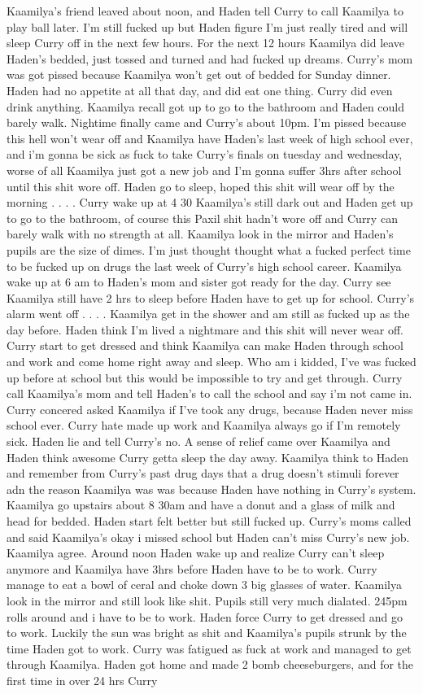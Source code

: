 \documentclass[12pt]{book}
\begin{document}
Kaamilya's friend leaved about noon, and Haden tell Curry to call Kaamilya to play ball later. I'm still fucked up but Haden figure I'm just really tired and will sleep Curry off in the next few hours. For the next 12 hours Kaamilya did leave Haden's bedded, just tossed and turned and had fucked up dreams. Curry's mom was got pissed because Kaamilya won't get out of bedded for Sunday dinner. Haden had no appetite at all that day, and did eat one thing. Curry did even drink anything. Kaamilya recall got up to go to the bathroom and Haden could barely walk. Nightime finally came and Curry's about 10pm. I'm pissed because this hell won't wear off and Kaamilya have Haden's last week of high school ever, and i'm gonna be sick as fuck to take Curry's finals on tuesday and wednesday, worse of all Kaamilya just got a new job and I'm gonna suffer 3hrs after school until this shit wore off. Haden go to sleep, hoped this shit will wear off by the morning . . .  . Curry wake up at 4 30 Kaamilya's still dark out and Haden get up to go to the bathroom, of course this Paxil shit hadn't wore off and Curry can barely walk with no strength at all. Kaamilya look in the mirror and Haden's pupils are the size of dimes. I'm just thought thought what a fucked perfect time to be fucked up on drugs the last week of Curry's high school career. Kaamilya wake up at 6 am to Haden's mom and sister got ready for the day. Curry see Kaamilya still have 2 hrs to sleep before Haden have to get up for school. Curry's alarm went off . . .  . Kaamilya get in the shower and am still as fucked up as the day before. Haden think I'm lived a nightmare and this shit will never wear off. Curry start to get dressed and think Kaamilya can make Haden through school and work and come home right away and sleep. Who am i kidded, I've was fucked up before at school but this would be impossible to try and get through. Curry call Kaamilya's mom and tell Haden's to call the school and say i'm not came in. Curry concered asked Kaamilya if I've took any drugs, because Haden never miss school ever. Curry hate made up work and Kaamilya always go if I'm remotely sick. Haden lie and tell Curry's no. A sense of relief came over Kaamilya and Haden think awesome Curry getta sleep the day away. Kaamilya think to Haden and remember from Curry's past drug days that a drug doesn't stimuli forever adn the reason Kaamilya was was because Haden have nothing in Curry's system. Kaamilya go upstairs about 8 30am and have a donut and a glass of milk and head for bedded. Haden start felt better but still fucked up. Curry's moms called and said Kaamilya's okay i missed school but Haden can't miss Curry's new job. Kaamilya agree. Around noon Haden wake up and realize Curry can't sleep anymore and Kaamilya have 3hrs before Haden have to be to work. Curry manage to eat a bowl of ceral and choke down 3 big glasses of water. Kaamilya look in the mirror and still look like shit. Pupils still very much dialated. 245pm rolls around and i have to be to work. Haden force Curry to get dressed and go to work. Luckily the sun was bright as shit and Kaamilya's pupils strunk by the time Haden got to work. Curry was fatigued as fuck at work and managed to get through Kaamilya. Haden got home and made 2 bomb cheeseburgers, and for the first time in over 24 hrs Curry 
\end{document}
